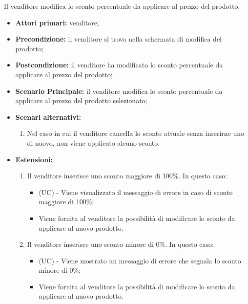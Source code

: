 Il venditore modifica lo sconto percentuale da applicare al prezzo del prodotto.
\begin{itemize}
    \item \textbf{Attori primari:} venditore;
    \item \textbf{Precondizione:} il venditore si trova nella schermata di modifica del prodotto;
    \item \textbf{Postcondizione:} il venditore ha modificato lo sconto percentuale da applicare al prezzo del prodotto;
    \item \textbf{Scenario Principale:} il venditore modifica lo sconto percentuale da applicare al prezzo del prodotto selezionato;
    \item \textbf{Scenari alternativi:}
    \begin{enumerate}[label=\lett]
    	\item Nel caso in cui il venditore cancella lo sconto attuale senza inserirne uno di nuovo, non viene applicato alcuno sconto.
    \end{enumerate}
    \item \textbf{Estensioni:}
    \begin{enumerate}[label=\lett]
    	\item Il venditore inserisce uno sconto maggiore di 100\%. In questo caso:
		\begin{itemize}
			\item (UC) - Viene visualizzato il messaggio di errore in caso di sconto maggiore di 100\%;
			\item Viene fornita al venditore la possibilità di modificare lo sconto da applicare al nuovo prodotto.
		\end{itemize}
		\item Il venditore inserisce uno sconto minore di 0\%. In questo caso:
		\begin{itemize}
			\item (UC) - Viene mostrato un messaggio di errore che segnala lo sconto minore di 0\%; %
			\item Viene fornita al venditore la possibilità di modificare lo sconto da applicare al nuovo prodotto.
		\end{itemize}
    \end{enumerate}
\end{itemize}

